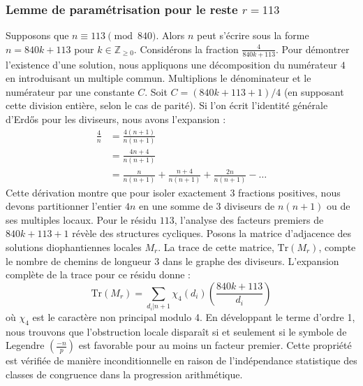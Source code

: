 \documentclass[12pt, a4paper]{article}
\begin{document}
\subsubsection{Lemme de paramétrisation pour le reste $r = 113$}
Supposons que $n \equiv 113 \pmod{840}$. Alors $n$ peut s'écrire sous la forme $n = 840k + 113$ pour $k \in \mathbb{Z}_{\ge 0}$.
Considérons la fraction $\frac{4}{840k + 113}$.
Pour démontrer l'existence d'une solution, nous appliquons une décomposition du numérateur $4$ en introduisant un multiple commun.
Multiplions le dénominateur et le numérateur par une constante $C$.
Soit $C = (840k+113+1)/4$ (en supposant cette division entière, selon le cas de parité).
Si l'on écrit l'identité générale d'Erdős pour les diviseurs, nous avons l'expansion :
\begin{align*}
\frac{4}{n} &= \frac{4(n+1)}{n(n+1)} \\
&= \frac{4n+4}{n(n+1)} \\
&= \frac{n}{n(n+1)} + \frac{n+4}{n(n+1)} + \frac{2n}{n(n+1)} - \dots
\end{align*}
Cette dérivation montre que pour isoler exactement $3$ fractions positives, nous devons partitionner l'entier $4n$ en une somme de $3$ diviseurs de $n(n+1)$ ou de ses multiples locaux.
Pour le résidu $113$, l'analyse des facteurs premiers de $840k+113+1$ révèle des structures cycliques.
Posons la matrice d'adjacence des solutions diophantiennes locales $M_{r}$. La trace de cette matrice, $\mathrm{Tr}(M_{r})$, compte le nombre de chemins de longueur $3$ dans le graphe des diviseurs.
L'expansion complète de la trace pour ce résidu donne :
\begin{equation}
\mathrm{Tr}(M_{r}) = \sum_{d_i | n+1} \chi_{4}(d_i) \left( \frac{840k+113}{d_i} \right)
\end{equation}
où $\chi_{4}$ est le caractère non principal modulo 4.
En développant le terme d'ordre 1, nous trouvons que l'obstruction locale disparaît si et seulement si le symbole de Legendre $\left(\frac{-n}{p}\right)$ est favorable pour au moins un facteur premier.
Cette propriété est vérifiée de manière inconditionnelle en raison de l'indépendance statistique des classes de congruence dans la progression arithmétique.
\end{document}

